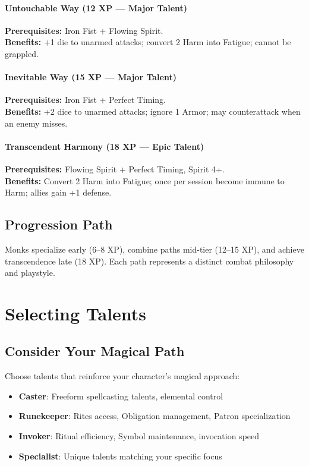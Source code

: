 \paragraph{Untouchable Way (12 XP --- Major Talent)} 
\textbf{Prerequisites:} Iron Fist + Flowing Spirit. \\
\textbf{Benefits:} +1 die to unarmed attacks; convert 2 Harm into Fatigue; cannot be grappled.

\paragraph{Inevitable Way (15 XP --- Major Talent)} 
\textbf{Prerequisites:} Iron Fist + Perfect Timing. \\
\textbf{Benefits:} +2 dice to unarmed attacks; ignore 1 Armor; may counterattack when an enemy misses.

\paragraph{Transcendent Harmony (18 XP --- Epic Talent)} 
\textbf{Prerequisites:} Flowing Spirit + Perfect Timing, Spirit 4+. \\
\textbf{Benefits:} Convert 2 Harm into Fatigue; once per session become immune to Harm; allies gain +1 defense.

\subsection*{Progression Path}
Monks specialize early (6--8 XP), combine paths mid-tier (12--15 XP), and achieve transcendence late (18 XP). Each path represents a distinct combat philosophy and playstyle.

\section{Selecting Talents}

\subsection*{Consider Your Magical Path}
Choose talents that reinforce your character's magical approach:
\begin{itemize}
\item \textbf{Caster}: Freeform spellcasting talents, elemental control
\item \textbf{Runekeeper}: Rites access, Obligation management, Patron specialization
\item \textbf{Invoker}: Ritual efficiency, Symbol maintenance, invocation speed
\item \textbf{Specialist}: Unique talents matching your specific focus
\end{itemize}

